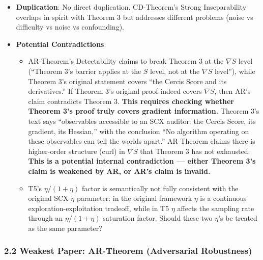 \documentclass[
  12pt,
]{article}
\providecommand{\tightlist}{%
  \setlength{\itemsep}{0pt}\setlength{\parskip}{0pt}}
\begin{document}
\begin{itemize}
\tightlist
\item
  \textbf{Duplication}: No direct duplication. CD-Theorem's Strong Inseparability overlaps in spirit with Theorem 3 but addresses different problems (noise vs difficulty vs noise vs confounding).
\item
  \textbf{Potential Contradictions}:
  \begin{itemize}
  \tightlist
  \item
    AR-Theorem's Detectability claims to break Theorem 3 at the $\nabla S$ level (``Theorem 3's barrier applies at the $S$ level, not at the $\nabla S$ level''), while Theorem 3's original statement covers ``the Cercis Score and its derivatives.'' If Theorem 3's original proof indeed covers $\nabla S$, then AR's claim contradicts Theorem 3. \textbf{This requires checking whether Theorem 3's proof truly covers gradient information.} Theorem 3's text says ``observables accessible to an SCX auditor: the Cercis Score, its gradient, its Hessian,'' with the conclusion ``No algorithm operating on these observables can tell the worlds apart.'' AR-Theorem claims there is higher-order structure (curl) in $\nabla S$ that Theorem 3 has not exhausted. \textbf{This is a potential internal contradiction --- either Theorem 3's claim is weakened by AR, or AR's claim is invalid.}
  \item
    T5's $\eta/(1+\eta)$ factor is semantically not fully consistent with the original SCX $\eta$ parameter: in the original framework $\eta$ is a continuous exploration-exploitation tradeoff, while in T5 $\eta$ affects the sampling rate through an $\eta/(1+\eta)$ saturation factor. Should these two $\eta$'s be treated as the same parameter?
  \end{itemize}
\end{itemize}

\subsubsection{2.2 Weakest Paper: \textbf{AR-Theorem (Adversarial Robustness)}}\label{weakest-paper-ar-theorem-adversarial-robustness}
\end{document}
